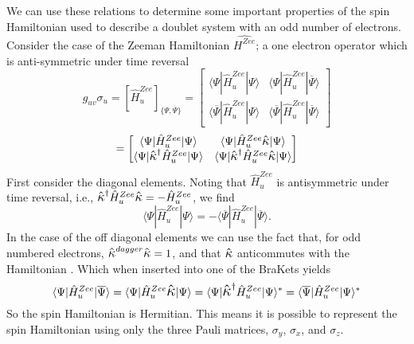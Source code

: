 \documentclass[12pt]{article}
\newcommand{\K}{\mathlarger{\mathlarger{\hat{\kappa}}}}
\begin{document}
\noindent We can use these relations to determine some important 
properties of the spin Hamiltonian
used to describe a doublet system with an odd number of electrons.
Consider the case of  the Zeeman Hamiltonian $\hat{H^{Zee}}$;
 a one electron operator which is anti-symmetric under time reversal 
\begin{equation*}
g_{uv}\sigma_{u} =
[\hat{H}_{u}^{Zee}]_{\{\Psi, \overline{\Psi}\}} = 
\begin{bmatrix}
\langle \Psi | \hat{H}^{Zee}_{u} |\Psi  \rangle &
\langle \Psi | \hat{H}^{Zee}_{u} | \overline{\Psi}  \rangle
\\ 
\langle \overline{\Psi} | \hat{H}^{Zee}_{u} | \Psi  \rangle &
\langle \overline{\Psi} | \hat{H}^{Zee}_{u} | \overline\Psi  \rangle
\end{bmatrix}
\end{equation*}
\begin{equation*}
=
\begin{bmatrix}
\langle \Psi | \hat{H}^{Zee}_{u}   | \Psi  \rangle &
\langle \Psi | \hat{H}^{Zee}_{u}\K | \Psi  \rangle
\\ 
\langle \Psi |\K^{\dagger} \hat{H}^{Zee}_{u} | \Psi  \rangle &
\langle \Psi |\K^{\dagger} \hat{H}^{Zee}_{u} \K | \Psi  \rangle
\end{bmatrix}
\end{equation*}
\noindent First consider the diagonal elements. Noting
that $\hat{H}^{Zee}_{u}$ is antisymmetric under time 
reversal, i.e., $\K^{\dagger} \hat{H}^{Zee}_{u} \K = - \hat{H}^{Zee}_{u}$,
we find 
\begin{equation}
\langle \Psi | \hat{H}^{Zee}_{u}   | \Psi  \rangle 
= -\langle \overline \Psi | \hat{H}^{Zee}_{u} | \overline \Psi  \rangle.
\end{equation}
\noindent In the case of the off diagonal elements we can
use the fact that, for odd numbered electrons, $\K^{dagger}\K = 1$,
and that $\K$ anticommutes with the Hamiltonian . Which
when inserted into one of the BraKets yields 
\begin{equation}
\langle \Psi | \hat{H}^{Zee}_{u} | \overline{\Psi}  \rangle
=
\langle \Psi | \hat{H}^{Zee}_{u} \K| \Psi  \rangle
=
\langle \Psi | \K^{\dagger} \hat{H}^{Zee}_{u} | \Psi  \rangle^{*} 
=
\langle \overline{\Psi} | \hat{H}^{Zee}_{u} | \Psi \rangle^{*} 
\end{equation}
\noindent So the spin Hamiltonian is Hermitian. This means it is possible to
represent the spin Hamiltonian using only the three Pauli matrices, $\sigma_{y}$,
$\sigma_{x}$, and $\sigma_{z}$.\\
\end{document}
